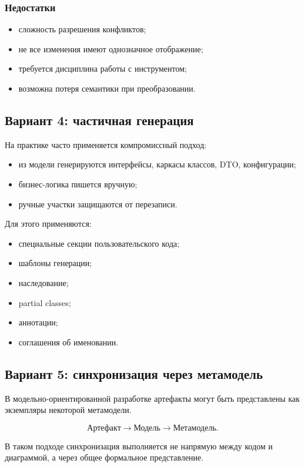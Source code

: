 \documentclass[12pt,a4paper]{article}
\begin{document}
\subsubsection*{Недостатки}
\begin{itemize}
    \item сложность разрешения конфликтов;
    \item не все изменения имеют однозначное отображение;
    \item требуется дисциплина работы с инструментом;
    \item возможна потеря семантики при преобразовании.
\end{itemize}

\subsection{Вариант 4: частичная генерация}

На практике часто применяется компромиссный подход:
\begin{itemize}
    \item из модели генерируются интерфейсы, каркасы классов, DTO, конфигурации;
    \item бизнес-логика пишется вручную;
    \item ручные участки защищаются от перезаписи.
\end{itemize}

Для этого применяются:
\begin{itemize}
    \item специальные секции пользовательского кода;
    \item шаблоны генерации;
    \item наследование;
    \item partial classes;
    \item аннотации;
    \item соглашения об именовании.
\end{itemize}

\subsection{Вариант 5: синхронизация через метамодель}

В модельно-ориентированной разработке артефакты могут быть представлены как экземпляры некоторой метамодели.

\[
\text{Артефакт}
\rightarrow
\text{Модель}
\rightarrow
\text{Метамодель}.
\]

В таком подходе синхронизация выполняется не напрямую между кодом и диаграммой, а через общее формальное представление.
\end{document}
